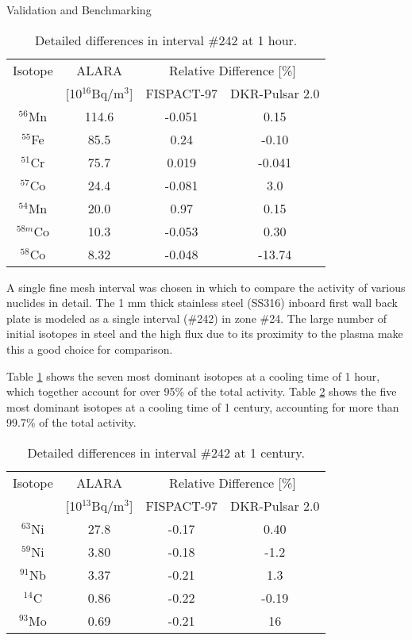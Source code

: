 \begin{chapter}{Validation and Benchmarking}
\begin{table}[b]
  \begin{center}
    \caption{Detailed differences in interval \#242 at 1 hour.}
    \label{tab:detail.1}
    \begin{tabular}{|c|c|c|c|}
      \hline
      Isotope & ALARA & \multicolumn{2}{c|}{Relative Difference [\%]} \\
              & [10$^{16}$Bq/m$^3$] & FISPACT-97 & DKR-Pulsar 2.0\\\hline
      $^{56}$Mn & 114.6 & -0.051 & 0.15 \\\hline
      $^{55}$Fe & 85.5 & 0.24 & -0.10 \\\hline
      $^{51}$Cr & 75.7 & 0.019 & -0.041 \\\hline
      $^{57}$Co & 24.4 & -0.081 &  3.0  \\\hline
      $^{54}$Mn & 20.0 & 0.97  &  0.15 \\\hline
      $^{58m}$Co & 10.3 & -0.053 & 0.30 \\\hline
      $^{58}$Co & 8.32 & -0.048 & -13.74  \\\hline
    \end{tabular}
  \end{center}
\end{table}

A single fine mesh interval was chosen in which to compare the
activity of various nuclides in detail.  The 1 mm thick stainless steel
(SS316) inboard first wall back plate is modeled as a single interval
(\#242) in zone \#24.  The large number of initial isotopes in steel
and the high flux due to its proximity to the plasma make this a good
choice for comparison.

Table \ref{tab:detail.1} shows the seven most dominant isotopes at a
cooling time of 1 hour, which together account for over 95\% of the
total activity.  Table \ref{tab:detail.2} shows the five most dominant
isotopes at a cooling time of 1 century, accounting for more than 99.7\% of
the total activity.  

\begin{table}[b]
  \begin{center}
    \caption{Detailed differences in interval \#242 at 1 century.}
    \label{tab:detail.2}
    \begin{tabular}{|c|c|c|c|}
      \hline
      Isotope & ALARA & \multicolumn{2}{c|}{Relative Difference [\%]} \\
              & [10$^{13}$Bq/m$^3$] & FISPACT-97 & DKR-Pulsar 2.0\\\hline
      $^{63}$Ni & 27.8 & -0.17 &  0.40 \\\hline
      $^{59}$Ni & 3.80 & -0.18  & -1.2 \\\hline
      $^{91}$Nb & 3.37 & -0.21  &  1.3  \\\hline
      $^{14}$C  & 0.86 & -0.22  & -0.19 \\\hline
      $^{93}$Mo & 0.69 & -0.21  & 16   \\\hline
    \end{tabular}
  \end{center}
\end{table}


\end{chapter}
